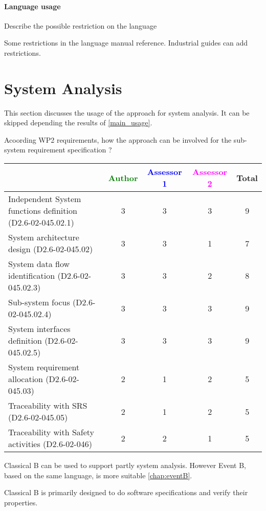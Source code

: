 \paragraph{Language usage} Describe the possible restriction on the language
\begin{author_comment}
Some restrictions in the language manual reference. Industrial guides can add restrictions.
\end{author_comment}

\section{System Analysis}
This section discusses the usage of the approach for system analysis.
It can be skipped depending the results of \ref{main_usage}.

Acoording WP2 requirements, how the approach can be involved for the sub-system requirement specification ?

\begin{tabular}{|l | c | c | c | c|}
\hline
& \textcolor{green}{Author} & \textcolor{blue}{Assessor 1} & \textcolor{magenta}{Assessor 2} & Total \\
\hline
Independent System functions definition (D2.6-02-045.02.1)  & 3 & 3 & 3 & 9 \\
\hline 
System architecture design (D2.6-02-045.02) & 3 & 3 & 1 & 7 \\
\hline
System data flow identification (D2.6-02-045.02.3)  & 3 & 3 & 2 & 8 \\
\hline
Sub-system focus (D2.6-02-045.02.4)  & 3 & 3 & 3 & 9 \\
\hline
System interfaces definition (D2.6-02-045.02.5)  & 3 & 3 & 3 & 9 \\
\hline
System requirement allocation (D2.6-02-045.03)  & 2 & 1 & 2 & 5 \\
\hline
Traceability with SRS (D2.6-02-045.05)  & 2 & 1 & 2 & 5 \\
\hline
Traceability with Safety activities (D2.6-02-046)  & 2 & 2 & 1 & 5 \\
\hline
\end{tabular}

\begin{author_comment}
Classical B can be used to  support partly  system analysis. However Event B, based on the same language, is more suitable \ref{chap:eventB}.
\end{author_comment}

\begin{assessor2}
Classical B is primarily designed to do software specifications and verify their properties.
\end{assessor2}

